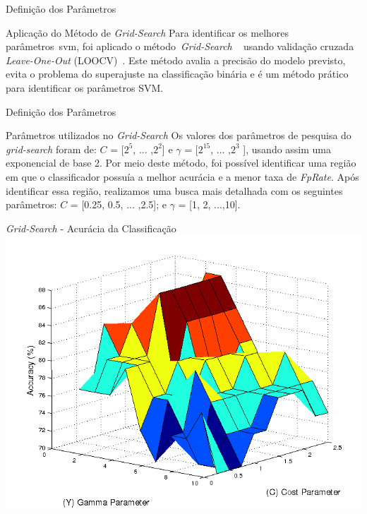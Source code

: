 \documentclass{beamer}
\begin{document}
\begin{frame}{Definição dos Parâmetros}
 \begin{block}{Aplicação do Método de \textit{Grid-Search}}
 Para identificar os melhores parâmetros~\ac{svm}, foi aplicado o método~\textit{Grid-Search} ~\cite{gridsearchsvm2010} usando validação cruzada \textit{Leave-One-Out} (LOOCV)~\cite{kantardzic2011data}. Este método avalia a precisão do modelo previsto, evita o problema do superajuste na classificação binária e é um método prático para identificar os parâmetros SVM.  
 \end{block}
\end{frame}

\begin{frame}{Definição dos Parâmetros}
 \begin{block}{Parâmetros utilizados no \textit{Grid-Search}}
    Os valores dos parâmetros de pesquisa do \textit{grid-search} foram de: $C$ = [$2^5$, ... ,$2^2$] e $\gamma$ = [$2^{15}$, ... ,$2^3$ ], usando assim uma exponencial de base 2. Por meio deste método, foi possível identificar uma região em que o classificador possuía a melhor acurácia e a menor taxa de \textit{FpRate}. Após identificar essa região, realizamos uma busca mais detalhada com os seguintes parâmetros: $C$ = [0.25, 0.5, ... ,2.5]; e $\gamma$ = [1, 2, ...,10].
 \end{block}
\end{frame}

\begin{frame}{\textit{Grid-Search} - Acurácia da Classificação}
      \includegraphics[scale=0.5]{./img/gridsearch.png}      
\end{frame}
\end{document}
